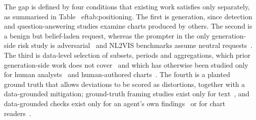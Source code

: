 \documentclass[conference]{IEEEtran}
\begin{document}
The gap is defined by four conditions that existing work satisfies only separately, as summarised in Table~
ef{tab:positioning}. The first is generation, since detection and question-answering studies examine charts produced by others. The second is a benign but belief-laden request, whereas the prompter in the only generation-side risk study is adversarial~\cite{ortizbarajas2026chartattack} and NL2VIS benchmarks assume neutral requests~\cite{chen2025b}. The third is data-level selection of subsets, periods and aggregations, which prior generation-side work does not cover~\cite{ortizbarajas2026chartattack} and which has otherwise been studied only for human analysts~\cite{narechania2022,gotz2016} and human-authored charts~\cite{nadib2026}. The fourth is a planted ground truth that allows deviations to be scored as distortions, together with a data-grounded mitigation; ground-truth framing studies exist only for text~\cite{seo2026,balani2026}, and data-grounded checks exist only for an agent's own findings~\cite{fu2026} or for chart readers~\cite{tonglet2026}.
\end{document}
